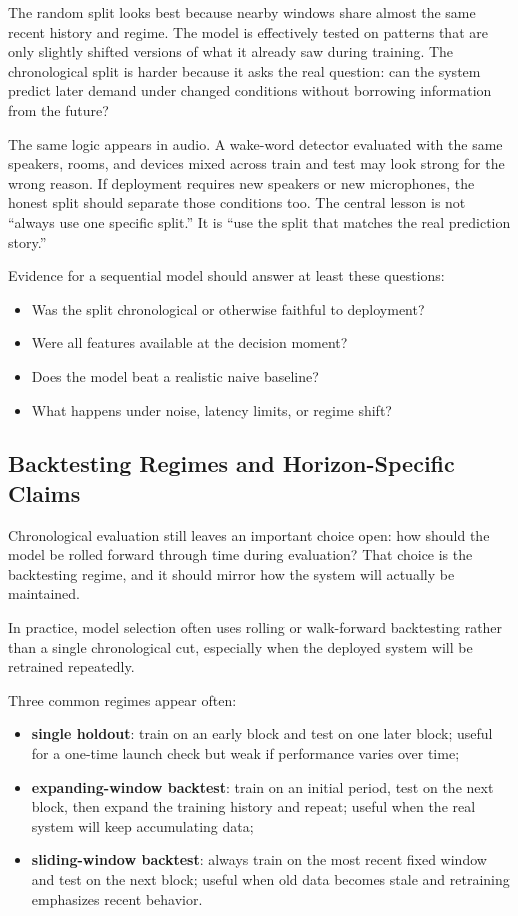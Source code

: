 The random split looks best because nearby windows share almost the same recent history and regime. The model is effectively tested on patterns that are only slightly shifted versions of what it already saw during training. The chronological split is harder because it asks the real question: can the system predict later demand under changed conditions without borrowing information from the future?

The same logic appears in audio. A wake-word detector evaluated with the same speakers, rooms, and devices mixed across train and test may look strong for the wrong reason. If deployment requires new speakers or new microphones, the honest split should separate those conditions too. The central lesson is not ``always use one specific split.'' It is ``use the split that matches the real prediction story.''

\begin{evidencebox}
Evidence for a sequential model should answer at least these questions:
\begin{itemize}[leftmargin=*]
\item Was the split chronological or otherwise faithful to deployment?
\item Were all features available at the decision moment?
\item Does the model beat a realistic naive baseline?
\item What happens under noise, latency limits, or regime shift?
\end{itemize}
\end{evidencebox}

\subsection{Backtesting Regimes and Horizon-Specific Claims}

Chronological evaluation still leaves an important choice open: how should the model be rolled forward through time during evaluation? That choice is the backtesting regime, and it should mirror how the system will actually be maintained.

In practice, model selection often uses rolling or walk-forward backtesting rather than a single chronological cut, especially when the deployed system will be retrained repeatedly.

Three common regimes appear often:
\begin{itemize}[leftmargin=*]
\item \textbf{single holdout}: train on an early block and test on one later block; useful for a one-time launch check but weak if performance varies over time;
\item \textbf{expanding-window backtest}: train on an initial period, test on the next block, then expand the training history and repeat; useful when the real system will keep accumulating data;
\item \textbf{sliding-window backtest}: always train on the most recent fixed window and test on the next block; useful when old data becomes stale and retraining emphasizes recent behavior.
\end{itemize}


